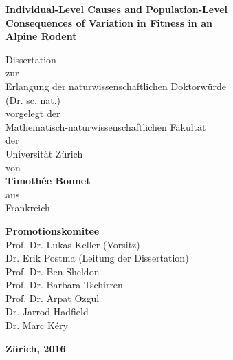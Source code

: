 \begin{titlepage}
	\thispagestyle{empty}
    \begin{center}
				 {\onehalfspacing \LARGE\selectfont\upshape\bfseries{Individual-Level Causes and Population-Level\\Consequences of Variation in Fitness in an\\ Alpine Rodent\\}}
				
				\vspace{1cm}
				
				\noindent\makebox[\linewidth]{\rule{0.8\paperwidth}{1pt}}
        
        \vspace{1cm}
				{\fontsize{22}{32pt}
				\doublespacing
        Dissertation
				\\
				zur
				\\
				Erlangung der naturwissenschaftlichen Doktorw\"urde
				\\
        (Dr. sc. nat.)
				\\
				vorgelegt der
				\\
				Mathematisch-naturwissenschaftlichen Fakult\"at
				\\
				der
				\\
				Universit\"at Z\"urich
				\\
				von
				\\
        \vspace{0.8cm}
        \textbf{Timoth\'ee Bonnet}
        \\
				aus
				\\
				Frankreich
				
				\vspace{0.8cm}
				\textbf{Promotionskomitee}
				\\
				Prof. Dr. Lukas Keller (Vorsitz)
				\\
				Dr. Erik Postma (Leitung der Dissertation)
				\\
				Prof. Dr. Ben Sheldon
				\\
				Prof. Dr. Barbara Tschirren
				\\
				Prof. Dr. Arpat Ozgul
				\\
				Dr. Jarrod Hadfield
				\\
				Dr. Marc K\'ery
				\\
				}
        \vfill
        
        \textbf{Z\"urich, 2016}
    \end{center}
	
\end{titlepage}


